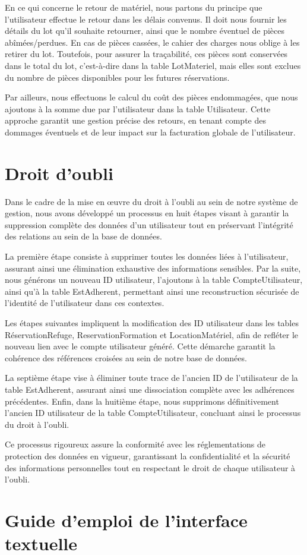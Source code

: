 En ce qui concerne le retour de matériel, nous partons du principe que l'utilisateur effectue le retour dans les délais convenus. Il doit nous fournir les détails du lot qu'il souhaite retourner, ainsi que le nombre éventuel de pièces abîmées/perdues. En cas de pièces cassées, le cahier des charges nous oblige à les retirer du lot. Toutefois, pour assurer la traçabilité, ces pièces sont conservées dans le total du lot, c'est-à-dire dans la table LotMateriel, mais elles sont exclues du nombre de pièces disponibles pour les futures réservations.

Par ailleurs, nous effectuons le calcul du coût des pièces endommagées, que nous ajoutons à la somme due par l'utilisateur dans la table Utilisateur. Cette approche garantit une gestion précise des retours, en tenant compte des dommages éventuels et de leur impact sur la facturation globale de l'utilisateur.


\section{Droit d'oubli}

Dans le cadre de la mise en œuvre du droit à l'oubli au sein de notre système de gestion, nous avons développé un processus en huit étapes visant à garantir la suppression complète des données d'un utilisateur tout en préservant l'intégrité des relations au sein de la base de données.

La première étape consiste à supprimer toutes les données liées à l'utilisateur, assurant ainsi une élimination exhaustive des informations sensibles. Par la suite, nous générons un nouveau ID utilisateur, l'ajoutons à la table CompteUtilisateur, ainsi qu'à la table EstAdherent, permettant ainsi une reconstruction sécurisée de l'identité de l'utilisateur dans ces contextes.

Les étapes suivantes impliquent la modification des ID utilisateur dans les tables RéservationRefuge, ReservationFormation et LocationMatériel, afin de refléter le nouveau lien avec le compte utilisateur généré. Cette démarche garantit la cohérence des références croisées au sein de notre base de données.

La septième étape vise à éliminer toute trace de l'ancien ID de l'utilisateur de la table EstAdherent, assurant ainsi une dissociation complète avec les adhérences précédentes. Enfin, dans la huitième étape, nous supprimons définitivement l'ancien ID utilisateur de la table CompteUtilisateur, concluant ainsi le processus du droit à l'oubli.

Ce processus rigoureux assure la conformité avec les réglementations de protection des données en vigueur, garantissant la confidentialité et la sécurité des informations personnelles tout en respectant le droit de chaque utilisateur à l'oubli.

\section{Guide d'emploi de l'interface textuelle}




